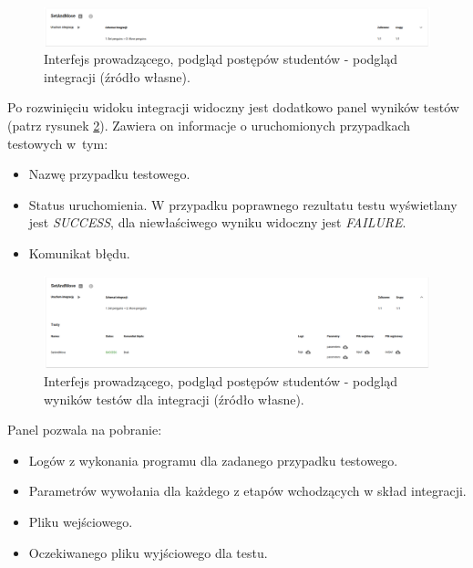 \begin{figure}[h]
    \centering
    \includegraphics[width = 13cm]{chapter04/lecturer_preview_integration.png}
    \caption{Interfejs prowadzącego, podgląd postępów studentów - podgląd integracji (źródło własne).}
    \label{fig:lecturer-preview-integration}
\end{figure}

Po rozwinięciu widoku integracji widoczny jest dodatkowo panel wyników testów (patrz rysunek \ref{fig:lecturer-preview-integration-tests}).
Zawiera on informacje o uruchomionych przypadkach testowych w~tym:
\begin{itemize}
    \item Nazwę przypadku testowego.
    \item Status uruchomienia. W przypadku poprawnego rezultatu testu wyświetlany jest \textit{SUCCESS}, dla niewłaściwego wyniku widoczny jest \textit{FAILURE}.
    \item Komunikat błędu.
\end{itemize}

\begin{figure}[h]
    \centering
    \includegraphics[width = 13cm]{chapter04/lecturer_preview_integration_tests.png}
    \caption{Interfejs prowadzącego, podgląd postępów studentów - podgląd wyników testów dla integracji (źródło własne).}
    \label{fig:lecturer-preview-integration-tests}
\end{figure}

Panel pozwala na pobranie:
\begin{itemize}
    \item Logów z wykonania programu dla zadanego przypadku testowego.
    \item Parametrów wywołania dla każdego z etapów wchodzących w skład integracji.
    \item Pliku wejściowego.
    \item Oczekiwanego pliku wyjściowego dla testu.
\end{itemize}





